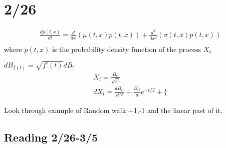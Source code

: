 \documentclass[answers,12pt,addpoints]{exam}
\begin{document}
\section{2/26}
\begin{definition}
    \begin{gather*}
        \frac{d p(t,x)}{dt} = \frac{d}{dx} (\mu(t,x)p(t,x)) + \frac{d^2}{dx^2} (\sigma(t,x)p(t,x))\\  
    \end{gather*}
    where $p(t,x)$ is the probability density function of the process $X_t$\\
\end{definition}
\begin{definition}[$B_{f(t)}$]
    $d B_{f(t)} = \sqrt{f'(t)} dB_t$\\
    \begin{gather*}
        X_t = \frac{B_{e^t}}{\sqrt{e^t}} \\
        dX_t = \frac{dB_{e^t}}{e^{t/2}} + \frac{B_{e^t}}de^{-t/2} + \lbrace 
    \end{gather*}
\end{definition}
Look through example of Random walk +1,-1 and the linear past of it. 


\subsection{Reading 2/26-3/5}
\end{document}

